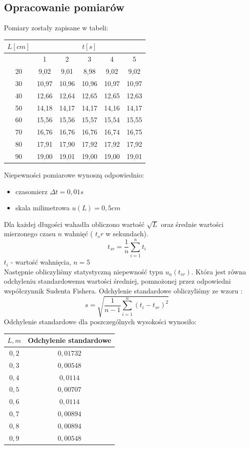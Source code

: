 \documentclass{article}
\begin{document}
\subsection{Opracowanie pomiarów}
Pomiary zostały zapisane w tabeli:
\begin{center}
    \begin{tabular}{|c|c|c|c|c|c|}
    \hline
    $L[cm]$ & \multicolumn{5}{|c|}{$t[s]$} \\ \hline
    \  & 1 & 2 & 3 & 4 & 5 \\ \hline
    20 & 9,02 & 9,01 & 8,98 & 9,02 & 9,02 \\ \hline
    30 & 10,97 & 10,96 & 10,96 & 10,97 & 10,97 \\ \hline
    40 & 12,66 & 12,64 & 12,65 & 12,65 & 12,63 \\ \hline
    50 & 14,18 & 14,17 & 14,17 & 14,16 & 14,17 \\ \hline
    60 & 15,56 & 15,56 & 15,57 & 15,54 & 15,55 \\ \hline
    70 & 16,76 & 16,76 & 16,76 & 16,74 & 16,75 \\ \hline
    80 & 17,91 & 17,90 & 17,92 & 17,92 & 17,92 \\ \hline
    90 & 19,00 & 19,01 & 19,00 & 19,00 & 19,01 \\ \hline
    \end{tabular}
\end{center}
Niepewności pomiarowe wynoszą odpowiednio:
\begin{itemize}
    \item czasomierz $\Delta t = 0,01s$
    \item skala milimetrowa $u(L) = 0,5cm$
\end{itemize}
Dla każdej długości wahadła obliczono wartość $\sqrt{L}$ oraz średnie wartości mierzonego czasu $n$ wahnięć ( $t_sr$ w sekundach).
$$t_{sr}=\frac{1}{n}\sum\limits_{i=1}^n t_i$$
$t_i$ - wartość wahnięcia, $n=5$\\
Następnie obliczyliśmy statystyczną niepewność typu $u_a(t_{sr})$. Która jest równa odchyleniu standardowemu wartości średniej, pomnożonej przez odpowiedni współczynnik Sudenta Fishera. Odchylenie standardowe obliczyliśmy ze wzoru :
$$s = \sqrt{\frac{1}{n-1}\sum\limits_{i=1}^n (t_i - t_{sr})^2}$$
Odchylenie standardowe dla poszczególnych wysokości wynosiło:
\begin{center}
    \begin{tabular}{|c|c|}
    \hline
    $L, m$ & Odchylenie standardowe \\ \hline
    $0,2$ & $0,01732$ \\ \hline
    $0,3$ & $0,00548$ \\ \hline
    $0,4$ & $0,0114$ \\ \hline
    $0,5$ & $0,00707$ \\ \hline
    $0,6$ & $0,0114$ \\ \hline
    $0,7$ & $0,00894$ \\ \hline
    $0,8$ & $0,00894$ \\ \hline
    $0,9$ & $0,00548$ \\ \hline    
    \end{tabular}
\end{center}
\end{document}
